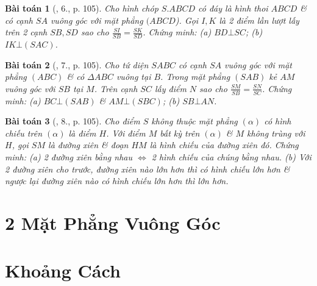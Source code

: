 \documentclass{article}
\numberwithin{equation}{section}
\newtheorem{baitoan}{Bài toán}
\begin{document}
\begin{baitoan}[\cite{SGK_Toan_11_hinh_hoc_co_ban}, 6., p. 105]
	Cho hình chóp $S.ABCD$ có đáy là hình thoi $ABCD$ \& có cạnh $SA$ vuông góc với mặt phẳng $(ABCD$). Gọi $I,K$ là 2 điểm lần lượt lấy trên 2 cạnh $SB,SD$ sao cho $\frac{SI}{SB} = \frac{SK}{SD}$. Chứng minh: (a) $BD\bot SC$; (b) $IK\bot(SAC)$.
\end{baitoan}

\begin{baitoan}[\cite{SGK_Toan_11_hinh_hoc_co_ban}, 7., p. 105]
	Cho tứ diện $SABC$ có cạnh $SA$ vuông góc với mặt phẳng $(ABC)$ \& có $\Delta ABC$ vuông tại $B$. Trong mặt phẳng $(SAB)$ kẻ $AM$ vuông góc với $SB$ tại $M$. Trên cạnh $SC$ lấy điểm $N$ sao cho $\frac{SM}{SB} = \frac{SN}{SC}$. Chứng minh: (a) $BC\bot(SAB)$ \& $AM\bot(SBC)$; (b) $SB\bot AN$.
\end{baitoan}

\begin{baitoan}[\cite{SGK_Toan_11_hinh_hoc_co_ban}, 8., p. 105]
	Cho điểm $S$ không thuộc mặt phẳng $(\alpha)$ có hình chiếu trên $(\alpha)$ là điểm $H$. Với điểm $M$ bất kỳ trên $(\alpha)$ \& $M$ không trùng với $H$, gọi $SM$ là đường xiên \& đoạn $HM$ là hình chiếu của đường xiên đó. Chứng minh: (a) 2 đường xiên bằng nhau $\Leftrightarrow$ 2 hình chiếu của chúng bằng nhau. (b) Với 2 đường xiên cho trước, đường xiên nào lớn hơn thì có hình chiếu lớn hơn \& ngược lại đường xiên nào có hình chiếu lớn hơn thì lớn hơn.
\end{baitoan}


\section{2 Mặt Phẳng Vuông Góc}


\section{Khoảng Cách}


\printbibliography[heading=bibintoc]
	
\end{document}
